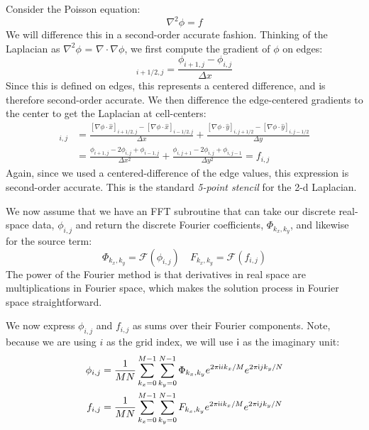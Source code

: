 Consider the Poisson equation:
\begin{equation}
\nabla^2 \phi = f
\end{equation}
We will difference this in a second-order accurate fashion.  Thinking
of the Laplacian as $\nabla^2 \phi$ = $\nabla \cdot \nabla \phi$, we
first compute the gradient of $\phi$ on edges:
\begin{equation}
[\nabla \phi \cdot \hat{x}]_{i+1/2,j} = \frac{\phi_{i+1,j} - \phi_{i,j}}{\Delta x}
\end{equation}
Since this is defined on edges, this represents a centered difference, and is
therefore second-order accurate.  We then difference the edge-centered
gradients to the center to get the Laplacian at cell-centers:
\begin{align}
[\nabla^2 \phi]_{i,j} &=
   \frac{[\nabla \phi \cdot \hat{x}]_{i+1/2,j} -
         [\nabla \phi \cdot \hat{x}]_{i-1/2,j}}{\Delta x} +
   \frac{[\nabla \phi \cdot \hat{y}]_{i,j+1/2} -
         [\nabla \phi \cdot \hat{y}]_{i,j-1/2}}{\Delta y} \nonumber\\
%
  &= \frac{\phi_{i+1,j} - 2\phi_{i,j} + \phi_{i-1,j}}{\Delta x^2} +
     \frac{\phi_{i,j+1} - 2\phi_{i,j} + \phi_{i,j-1}}{\Delta y^2} = f_{i,j}
\end{align}        
Again, since we used a centered-difference of the edge values, this
expression is second-order accurate.  This is the standard
{\em 5-point stencil} for the 2-d Laplacian.

We now assume that we have an FFT subroutine that can take our
discrete real-space data, $\phi_{i,j}$ and return the discrete
Fourier coefficients, $\Phi_{k_x,k_y}$, and likewise for the source
term:
\begin{equation}
\Phi_{k_x,k_y} = \mathcal{F}(\phi_{i,j}) \quad
F_{k_x,k_y} = \mathcal{F}(f_{i,j})
\end{equation}
The power of the Fourier method is that derivatives in real space are
multiplications in Fourier space, which makes the solution process in
Fourier space straightforward.

We now express $\phi_{i,j}$ and $f_{i,j}$ as sums over their Fourier
components.  Note, because we are using $i$ as the grid index, we will
use $\mathsf{i}$ as the imaginary unit:
\begin{align}
\phi_{i,j} &= \frac{1}{MN} \sum_{k_x = 0}^{M-1} \sum_{k_y = 0}^{N-1}
  \Phi_{k_x,k_y} e^{2\pi\mathsf{i} i k_x/M} e^{2\pi\mathsf{i} j k_y/N} \\
f_{i,j} &= \frac{1}{MN} \sum_{k_x = 0}^{M-1} \sum_{k_y = 0}^{N-1}
  F_{k_x,k_y} e^{2\pi\mathsf{i} i k_x/M} e^{2\pi\mathsf{i} j k_y/N} 
\end{align}

